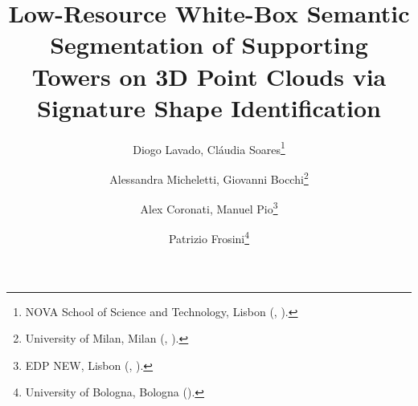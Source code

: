 

\usepackage{lipsum}
\usepackage{amsfonts}
\usepackage{graphicx}
\usepackage{epstopdf}
\usepackage{algorithmic}
\ifpdf
\else
\fi

\usepackage{enumitem}

\newcommand{\creflastconjunction}{, and~}



\title{
Low-Resource White-Box Semantic Segmentation of Supporting Towers on 3D Point Clouds via Signature Shape Identification
}



\author{Diogo Lavado\footnotemark[1], Cláudia Soares\thanks{NOVA School of Science and Technology, Lisbon 
  (, ).}
\and Alessandra Micheletti\footnotemark[2], Giovanni Bocchi\thanks{University of Milan, Milan
  (, ).}
\and Alex Coronati\footnotemark[3], Manuel Pio\thanks{EDP NEW, Lisbon
  (, ).}
\and Patrizio Frosini\thanks{University of Bologna, Bologna
  ().}
}

